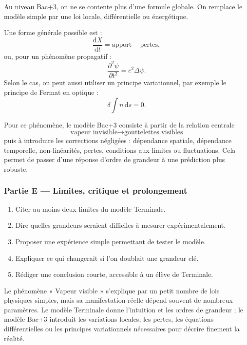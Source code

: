\documentclass[11pt,a4paper]{article}
\begin{document}
\begin{approfondissementbox}
Au niveau Bac+3, on ne se contente plus d'une formule globale. On remplace le modèle simple par une loi locale, différentielle ou énergétique.

Une forme générale possible est :
\[
\frac{\mathrm d X}{\mathrm dt}=\text{apport}-\text{pertes},
\]
ou, pour un phénomène propagatif :
\[
\frac{\partial^2 \psi}{\partial t^2}=c^2\Delta\psi.
\]
Selon le cas, on peut aussi utiliser un principe variationnel, par exemple le principe de Fermat en optique :
\[
\delta \int n\,\mathrm ds=0.
\]

Pour ce phénomène, le modèle Bac+3 consiste à partir de la relation centrale
\[
\text{vapeur invisible}\to\text{gouttelettes visibles}
\]
puis à introduire les corrections négligées : dépendance spatiale, dépendance temporelle, non-linéarités, pertes, conditions aux limites ou fluctuations. Cela permet de passer d'une réponse d'ordre de grandeur à une prédiction plus robuste.
\end{approfondissementbox}

\subsubsection*{Partie E — Limites, critique et prolongement}

\begin{enumerate}
  \item Citer au moins deux limites du modèle Terminale.
  \item Dire quelles grandeurs seraient difficiles à mesurer expérimentalement.
  \item Proposer une expérience simple permettant de tester le modèle.
  \item Expliquer ce qui changerait si l'on doublait une grandeur clé.
  \item Rédiger une conclusion courte, accessible à un élève de Terminale.
\end{enumerate}

\begin{corrigebox}
Le phénomène « Vapeur visible » s'explique par un petit nombre de lois physiques simples, mais sa manifestation réelle dépend souvent de nombreux paramètres. Le modèle Terminale donne l'intuition et les ordres de grandeur ; le modèle Bac+3 introduit les variations locales, les pertes, les équations différentielles ou les principes variationnels nécessaires pour décrire finement la réalité.
\end{corrigebox}
\end{document}
